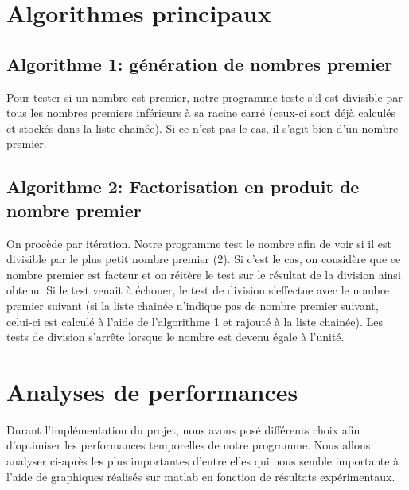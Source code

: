 \documentclass[11pt,a4paper]{article}
\begin{document}
\section*{Algorithmes principaux}
 \subsection*{Algorithme 1: génération de nombres premier}
 
Pour tester si un nombre est premier, notre programme teste s'il est divisible par tous les nombres premiers inférieurs à sa racine carré (ceux-ci sont déjà calculés et stockés dans la liste chainée). Si ce n'est pas le cas, il s'agit bien d'un nombre premier. 
 
 
 \subsection*{Algorithme 2: Factorisation en produit de nombre premier}   
 
 On procède par itération. Notre programme test le nombre afin de voir si il est divisible par le plus petit nombre premier (2). Si c'est le cas, on considère que ce nombre premier est facteur et on réitère le test sur le résultat de la division ainsi obtenu. Si le test venait à échouer, le test de division s'effectue avec le nombre premier suivant (si la liste chainée n'indique pas de nombre premier suivant, celui-ci est calculé à l'aide de l'algorithme 1 et rajouté à la liste chainée). Les tests de division s'arrête lorsque le nombre est devenu égale à l'unité.
 
\section*{Analyses de performances}

Durant l'implémentation du projet, nous avons posé différents choix afin d'optimiser les performances temporelles de notre programme. Nous allons analyser ci-après les plus importantes d'entre elles qui nous semble importante à l'aide de graphiques réalisés sur matlab en fonction de résultats expérimentaux.
\end{document}

